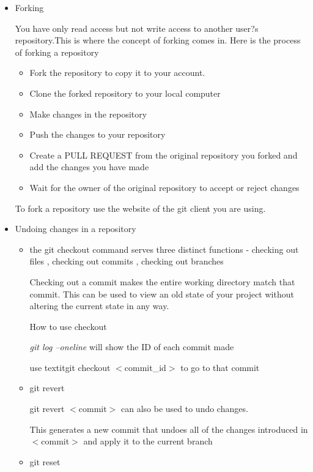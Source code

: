 \documentclass{article}
\begin{document}
\begin{itemize}
\item Forking 

You have only read access but not write access to another user?s repository.This is where the concept of forking comes in.
Here is the process of forking a repository

\begin{itemize}
\item Fork the repository to copy it to your account.
\item Clone the forked repository to your local computer
\item Make changes in the repository
\item Push the changes to your repository
\item Create a PULL REQUEST from the original repository you forked and add the changes you have made
\item Wait for the owner of the original repository to accept or reject changes
\end{itemize}

To fork a repository use the website of the git client you are using.

\item Undoing changes in a repository
\begin{itemize}
\item    the git checkout command serves three distinct functions - checking out files , checking out commits , checking out branches

Checking out a commit makes the entire working directory match that commit. This can be used to view an old state of your project without altering the current state in any way.

How to use checkout

\hspace{10mm} \textit{git log --oneline} will show the ID of each commit made 

\hspace{10mm} use textit{git checkout $<$commit\_id$>$} to go to that commit

\item git revert

\hspace{10mm} git revert $<$commit$>$ can also be used to undo changes. 

\hspace {10mm} This generates a new commit that undoes all of the changes introduced in $<$commit$>$  and apply it to the current branch

\item git reset


\end{itemize}
\end{itemize}
\end{document}
